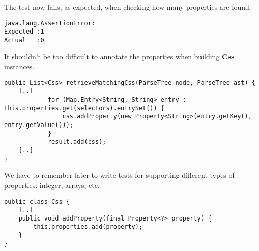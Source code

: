 \documentclass[11pt]{article}
\begin{document}
The test now fails, as expected, when checking how many properties are found.

\begin{verbatim}
java.lang.AssertionError: 
Expected :1
Actual   :0
\end{verbatim}

It shouldn't be too difficult to annotate the properties when building \textbf{Css} instances.

\begin{verbatim}
public List<Css> retrieveMatchingCss(ParseTree node, ParseTree ast) {
    [..]
            for (Map.Entry<String, String> entry : this.properties.get(selectors).entrySet()) {
                css.addProperty(new Property<String>(entry.getKey(), entry.getValue()));
            }
            result.add(css);
    [..]
}
\end{verbatim}

We have to remember later to write tests for supporting different types of properties: integer, arrays, etc.

\begin{verbatim}
public class Css {
    [..]
    public void addProperty(final Property<?> property) {
        this.properties.add(property);
    }
}
\end{verbatim}
\end{document}
